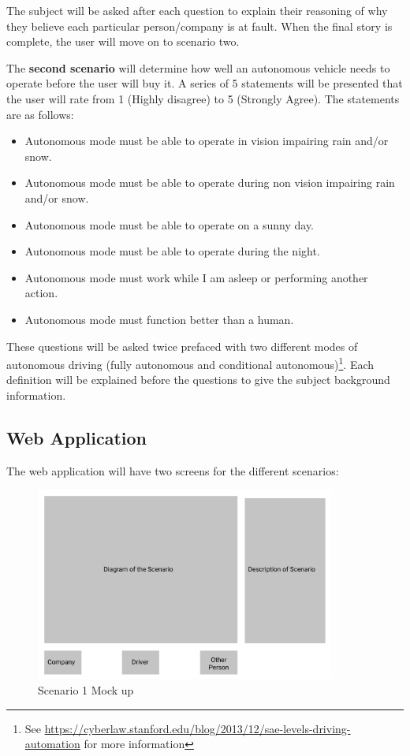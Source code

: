\documentclass{article}
\begin{document}
The subject will be asked after each question to explain their reasoning of why
they believe each particular person/company is at fault. When the final story is
complete, the user will move on to scenario two.

The \textbf{second scenario} will determine how well an autonomous vehicle needs
to operate before the user will buy it. A series of 5 statements will be
presented that the user will rate from 1 (Highly disagree) to 5 (Strongly
Agree). The statements are as follows:
\begin{itemize}
  \item Autonomous mode must be able to operate in vision impairing rain and/or
    snow.
  \item Autonomous mode must be able to operate during non vision impairing rain
    and/or snow.
  \item Autonomous mode must be able to operate on a sunny day.
  \item Autonomous mode must be able to operate during the night.
  \item Autonomous mode must work while I am asleep or performing another action.
  \item Autonomous mode must function better than a human.
\end{itemize}

These questions will be asked twice prefaced with two different modes of
autonomous driving (fully autonomous and conditional autonomous)\footnote{See
\url{https://cyberlaw.stanford.edu/blog/2013/12/sae-levels-driving-automation}
for more information}. Each definition will be explained before the questions to
give the subject background information.

\subsection{Web Application}
The web application will have two screens for the different scenarios:
\begin{figure}[H]
\centering
\includegraphics[height=2.5in]{imgs/scenario_1.png}
\caption{Scenario 1 Mock up}
\label{fig:scenario_1}
\end{figure}
\end{document}
